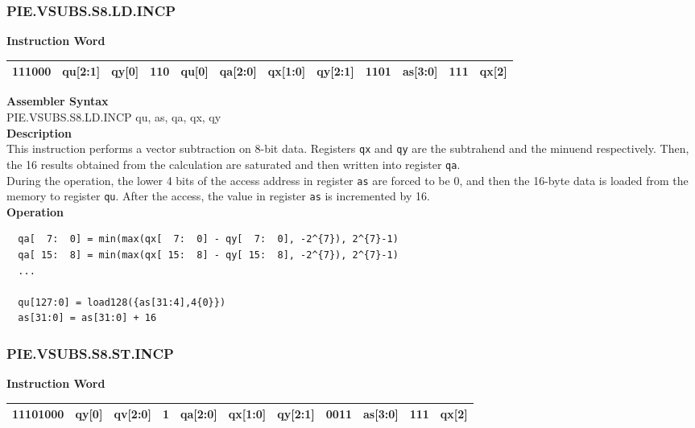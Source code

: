 \newpage
\subsubsection{PIE.VSUBS.S8.LD.INCP}\label{instruction:PIEVSUBSS8LDINCP}
\setlength\tabcolsep{6pt}
\textbf{Instruction Word} \\
\begin{tabular}{|c|c|c|c|c|c|c|c|c|c|c|c|}
	\hline
	111000 & qu[2:1] & qy[0] & 110 & qu[0] & qa[2:0] & qx[1:0] & qy[2:1] & 1101 & as[3:0] & 111 & qx[2] \\
	\hline
\end{tabular}

\textbf{Assembler Syntax} \\
PIE.VSUBS.S8.LD.INCP qu, as, qa, qx, qy \\
\textbf{Description} \\
This instruction performs a vector subtraction on 8-bit data. Registers \lstinline{qx} and \lstinline{qy} are the subtrahend and the minuend respectively. Then, the 16 results obtained from the calculation are saturated and then written into register \lstinline{qa}. \\ During the operation, the lower 4 bits of the access address in register \lstinline{as} are forced to be 0, and then the 16-byte data is loaded from the memory to register \lstinline{qu}. After the access, the value in register \lstinline{as} is incremented by 16.\\
\textbf{Operation}
\begin{lstlisting}
  qa[  7:  0] = min(max(qx[  7:  0] - qy[  7:  0], -2^{7}), 2^{7}-1)
  qa[ 15:  8] = min(max(qx[ 15:  8] - qy[ 15:  8], -2^{7}), 2^{7}-1)
  ...

  qu[127:0] = load128({as[31:4],4{0}})
  as[31:0] = as[31:0] + 16
\end{lstlisting}

\newpage
\subsubsection{PIE.VSUBS.S8.ST.INCP}\label{instruction:PIEVSUBSS8STINCP}
\setlength\tabcolsep{6pt}
\textbf{Instruction Word} \\
\begin{tabular}{|c|c|c|c|c|c|c|c|c|c|c|}
	\hline
	11101000 & qy[0] & qv[2:0] & 1 & qa[2:0] & qx[1:0] & qy[2:1] & 0011 & as[3:0] & 111 & qx[2] \\
	\hline
\end{tabular}

